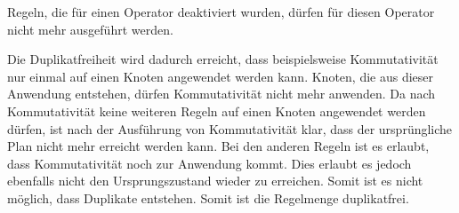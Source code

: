 Regeln, die für einen Operator deaktiviert wurden, dürfen für diesen Operator nicht mehr ausgeführt werden.


Die Duplikatfreiheit wird dadurch erreicht, dass beispielsweise Kommutativität nur einmal auf einen Knoten angewendet werden kann. Knoten, die aus dieser Anwendung entstehen, dürfen Kommutativität nicht mehr anwenden. Da nach Kommutativität keine weiteren Regeln auf einen Knoten angewendet werden dürfen, ist nach der Ausführung von Kommutativität klar, dass der ursprüngliche Plan nicht mehr erreicht werden kann. Bei den anderen Regeln ist es erlaubt, dass Kommutativität noch zur Anwendung kommt. Dies erlaubt es jedoch ebenfalls nicht den Ursprungszustand wieder zu erreichen. Somit ist es nicht möglich, dass Duplikate entstehen. Somit ist die Regelmenge duplikatfrei.



